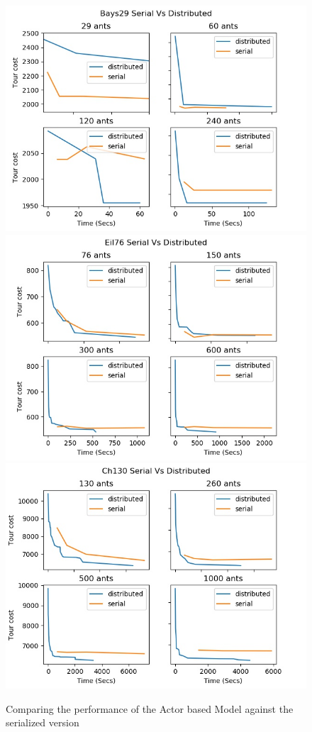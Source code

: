 \documentclass[12pt]{article}
\begin{document}
\begin{figure}
    \caption{Comparing the performance of the Actor based Model against the serialized version}
    \includegraphics[scale=0.5]{bays29_serial_vs_dist.jpg}
    \includegraphics[scale=0.5]{eil76_serial_vs_dist.jpg}
    \includegraphics[scale=0.5]{ch130_serial_vs_dist.jpg}

\end{figure}
\end{document}
